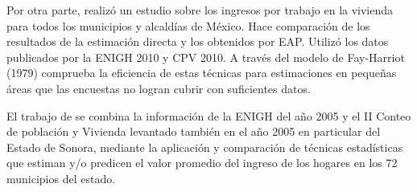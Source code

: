 \documentclass[
  11pt,
  oneside]{book}
\begin{document}
Por otra parte, \citep{Suárez2015} realizó un estudio sobre los ingresos por trabajo en la vivienda para todos los municipios y alcaldías de México. Hace comparación de los resultados de la estimación directa y los obtenidos por EAP. Utilizó los datos publicados por la ENIGH 2010 y CPV 2010. A través del modelo de Fay-Harriot (1979) comprueba la eficiencia de estas técnicas para estimaciones en pequeñas áreas que las encuestas no logran cubrir con suficientes datos.

El trabajo de \citep{Suárez2010} se combina la información de la ENIGH del año 2005 y el II Conteo de población y Vivienda levantado también en el año 2005 en particular del Estado de Sonora, mediante la aplicación y comparación de técnicas estadísticas que estiman y/o predicen el valor promedio del ingreso de los hogares en los 72 municipios del estado.

  
\end{document}
